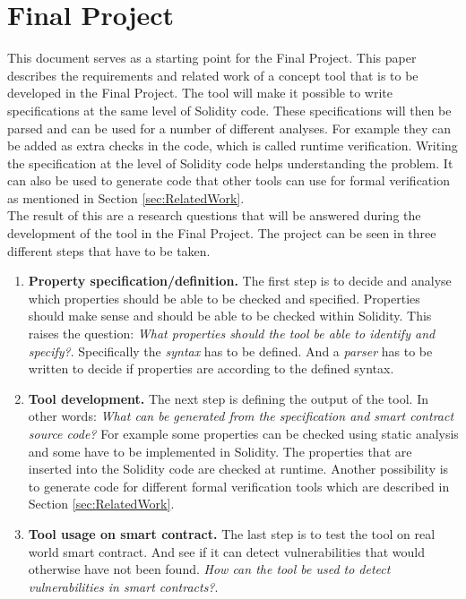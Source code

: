 \documentclass[a4paper]{article}
\begin{document}
\section{Final Project}
This document serves as a starting point for the Final Project. This paper describes the requirements and related work of a concept tool that is to be developed in the Final Project. The tool will make it possible to write specifications at the same level of Solidity code. These specifications will then be parsed and can be used for a number of different analyses. For example they can be added as extra checks in the code, which is called runtime verification. Writing the specification at the level of Solidity code helps understanding the problem. It can also be used to generate code that other tools can use for formal verification as mentioned in Section \ref{sec:RelatedWork}. \\
The result of this are a research questions that will be answered during the development of the tool in the Final Project. The project can be seen in three different steps that have to be taken.
\begin{enumerate}
    \item \textbf{Property specification/definition.}
    The first step is to decide and analyse which properties should be able to be checked and specified. Properties should make sense and should be able to be checked within Solidity. This raises the question:
    \textit{What properties should the tool be able to identify and specify?}. Specifically the \textit{syntax} has to be defined. And a \textit{parser} has to be written to decide if properties are according to the defined syntax. 
    \item \textbf{Tool development.}
    The next step is defining the output of the tool. In other words: \textit{What can be generated from the specification and smart contract source code?} For example some properties can be checked using static analysis and some have to be implemented in Solidity. The properties that are inserted into the Solidity code are checked at runtime. Another possibility is to generate code for different formal verification tools which are described in Section \ref{sec:RelatedWork}.
    \item \textbf{Tool usage on smart contract.}
    The last step is to test the tool on real world smart contract. And see if it can detect vulnerabilities that would otherwise have not been found. \textit{How can the tool be used to detect vulnerabilities in smart contracts?}.
\end{enumerate}
\end{document}
